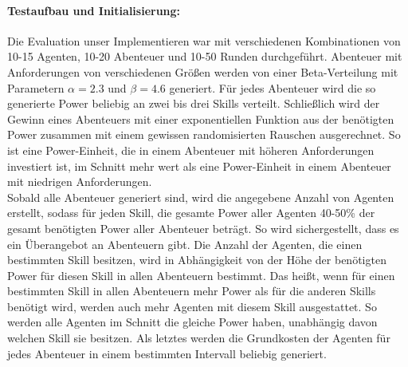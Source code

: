 \documentclass[fleqn,10pt]{SelfArx} %
\begin{document}
\paragraph{Testaufbau und Initialisierung:}
Die Evaluation unser Implementieren war mit verschiedenen Kombinationen von 10-15 Agenten, 10-20 Abenteuer und 10-50 Runden durchgeführt. Abenteuer mit Anforderungen von verschiedenen Größen werden von einer Beta-Verteilung mit Parametern $\alpha=2.3$ und $\beta=4.6$ generiert. Für jedes Abenteuer wird die so generierte Power beliebig an zwei bis drei Skills verteilt. Schließlich wird der Gewinn eines Abenteuers mit einer exponentiellen Funktion aus der benötigten Power zusammen mit einem gewissen randomisierten Rauschen ausgerechnet. So ist eine Power-Einheit, die in einem Abenteuer mit höheren Anforderungen investiert ist, im Schnitt mehr wert als eine Power-Einheit in einem Abenteuer mit niedrigen Anforderungen.\\
Sobald alle Abenteuer generiert sind, wird die angegebene Anzahl von Agenten erstellt, sodass für jeden Skill, die gesamte Power aller Agenten 40-50\% der gesamt benötigten Power aller Abenteuer beträgt. So wird sichergestellt, dass es ein Überangebot an Abenteuern gibt. Die Anzahl der Agenten, die einen bestimmten Skill besitzen, wird in Abhängigkeit von der Höhe der benötigten Power für diesen Skill in allen Abenteuern bestimmt. Das heißt, wenn für einen bestimmten Skill in allen Abenteuern mehr Power als für die anderen Skills benötigt wird, werden auch mehr Agenten mit diesem Skill ausgestattet. So werden alle Agenten im Schnitt die gleiche Power haben, unabhängig davon welchen Skill sie besitzen. Als letztes werden die Grundkosten der Agenten für jedes Abenteuer in einem bestimmten Intervall beliebig generiert.
\end{document}
